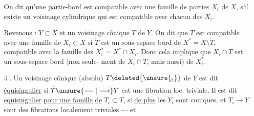On dit qu'une partie-bord  est \uline{compatible} avec
une famille de parties $X_i$ de $X$, s'il
existe un voisinage cylindrique qui est
compatible  avec chacun des $X_i$.

Revenons : $Y\subset X$ et un voisinage
cônique  $T$ de $Y$. On dit que $T$ est
 compatible avec une famille de $X_i\subset X$
si 
$\dot T$ est un sous-espace bord de
$X^*=X\setminus\mathring T$, compatible avec la famille des
$X_i^*=X^*\cap X_i$. Donc cela implique que
$X_i\cap\dot T$ est un sous-espace bord (non seule-
ment de $X_i\cap T$, mais aussi) de $X_i^*$.

\textcircled{4}.  Un voisinage cônique (absolu)
$T\deleted{\unsure{_\varepsilon}}$ de
$Y$ est dit \uline{équisingulier} si $\dot T\overset{-}{\unsure{\relbar\joinrel\relbar|\longrightarrow}}Y$ est une
fibration loc. triviale. Il est dit \uline{equisingulier}
\uline{pour une famille} \uline{de} $T_i\subset T$, si \uline{de plus}
les $Y_i$ sont coniques, et $\dot T_i\longrightarrow Y$ sont des
fibrations localement triviales --- et 
